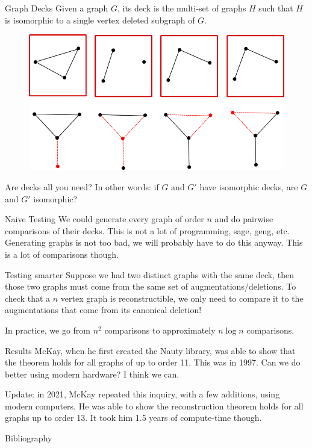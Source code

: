 \documentclass[aspectratio=169]{beamer}
\begin{document}
\begin{frame}{Graph Decks}
    Given a graph $G$, its deck is the multi-set of graphs $H$ such that $H$ is isomorphic to a single vertex deleted subgraph of $G$.
    \begin{figure}
        \centering
        \includegraphics[width = 0.9\linewidth]{deck.png}
    \end{figure}
\end{frame}

\begin{frame}{Are decks all you need?}
    In other words: if $G$ and $G'$ have isomorphic decks, are $G$ and $G'$ isomorphic? 
\end{frame}

\begin{frame}{Naive Testing}
    We could generate every graph of order $n$ and do pairwise comparisons of their decks. This is not a lot of programming, sage, geng, etc. Generating graphs is not too bad, we will probably have to do this anyway. This is a lot of comparisons though. 
\end{frame}

\begin{frame}{Testing smarter}
Suppose we had two distinct graphs with the same deck, then those two graphs must come from the same set of augmentations/deletions. To check that a $n$ vertex graph is reconstructible, we only need to compare it to the augmentations that come from its canonical deletion! 

\hfill

In practice, we go from $n^2$ comparisons to approximately $n \log n$ comparisons.  
\end{frame}

\begin{frame}{Results}
    McKay, when he first created the Nauty library, was able to show that the theorem holds for all graphs of up to order 11. This was in 1997. Can we do better using modern hardware? I think we can. \cite{McKay1997SmallGA} \pause

    \hfill

    Update: in 2021, McKay repeated this inquiry, with a few additions, using modern computers. He was able to show the reconstruction theorem holds for all graphs up to order 13. It took him 1.5 years of compute-time though. \cite{McKaySmallGraphsReconstruction}
\end{frame}



\begin{frame}{Bibliography}
    
    {\scriptsize }
\end{frame}
\end{document}

